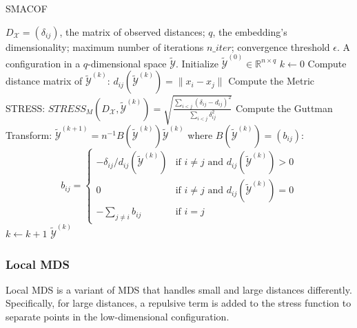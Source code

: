 \begin{algorithm}
    \caption{SMACOF}
    \label{alg:SMACOF}
    
    \begin{algorithmic}[1]
    \REQUIRE $D_{\mathcal{X}} = (\delta_{ij})$, the matrix of observed distances; $q$, the embedding's dimensionality; maximum number of iterations $n\_iter$; convergence threshold $\epsilon$.
    \ENSURE A configuration in a $q$-dimensional space $\tilde{\mathcal{Y}}$.
    \STATE Initialize $\tilde{\mathcal{Y}}^{(0)} \in \mathbb{R}^{n \times q}$
    \STATE $k \leftarrow 0$
    \REPEAT
        \STATE Compute distance matrix of $\tilde{\mathcal{Y}}^{(k)}$:  $d_{ij}(\tilde{\mathcal{Y}}^{(k)}) = \|x_i - x_j\|$
        \STATE Compute the Metric STRESS: $STRESS_M(D_{\mathcal{X}}, \tilde{\mathcal{Y}}^{(k)}) = \sqrt{\frac{\sum_{i<j}\left(\delta_{i j}-d_{i j}\right)^2}{\sum_{i<j} \delta_{i j}^2}}$
        \STATE Compute the Guttman Transform: $\tilde{\mathcal{Y}}^{(k+1)} = n^{-1}B(\tilde{\mathcal{Y}}^{(k)})\tilde{\mathcal{Y}}^{(k)}$ where $B(\tilde{\mathcal{Y}}^{(k)}) = (b_{ij})$:
        $$
        b_{ij} =
        \begin{cases}
        -\delta_{ij}/d_{ij}(\tilde{\mathcal{Y}}^{(k)}) & \text{if } i \neq j \text{ and } d_{ij}(\tilde{\mathcal{Y}}^{(k)}) > 0 \\
        0 & \text{if } i \neq j \text{ and } d_{ij}(\tilde{\mathcal{Y}}^{(k)}) = 0 \\
        -\sum_{j \neq i} b_{ij} & \text{if } i = j
        \end{cases}
        $$
        \STATE $k \leftarrow k + 1$
    \RETURN $\tilde{\mathcal{Y}}^{(k)}$
    \end{algorithmic}
\end{algorithm}

\subsubsection{Local MDS}

Local MDS \cite{LocalMDS} is a variant of MDS that handles small and large distances differently. Specifically, for large distances, a repulsive term is added to the stress function to separate points in the low-dimensional configuration.

